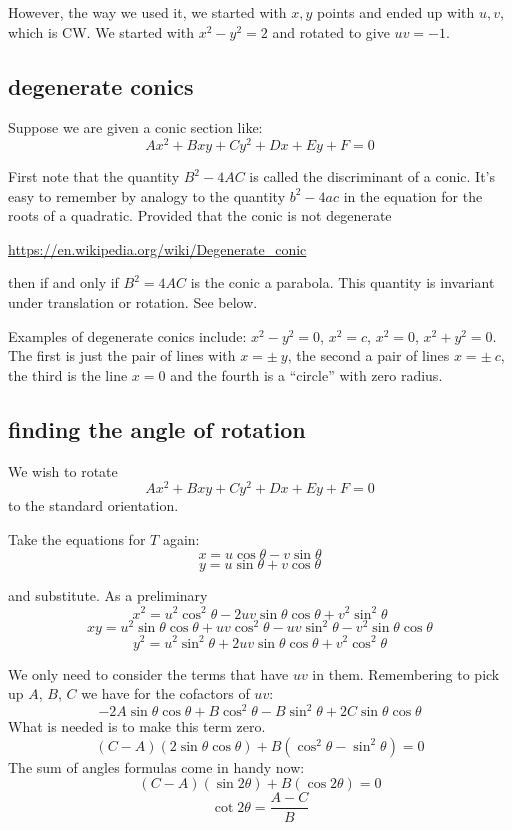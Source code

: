 \documentclass[11pt, oneside]{article}
\begin{document}
However, the way we used it, we started with $x,y$ points and ended up with $u,v$, which is CW.   We started with $x^2 - y^2 = 2$ and rotated to give $uv = - 1$.

\subsection*{degenerate conics}

Suppose we are given a conic section like:
\[ Ax^2 + Bxy + Cy^2 + Dx + Ey + F = 0 \] 

First note that the quantity $B^2 - 4AC$ is called the discriminant of a conic.  It's easy to remember by analogy to the quantity $b^2 - 4ac$ in the equation for the roots of a quadratic.  Provided that the conic is not degenerate

\url{https://en.wikipedia.org/wiki/Degenerate_conic}

then if and only if $B^2 = 4AC$ is the conic a parabola.  This quantity is invariant under translation or rotation.  See below.

Examples of degenerate conics include:  $x^2 - y^2 = 0$, $x^2 = c$, $x^2 = 0$, $x^2 + y^2 = 0$.  The first is just the pair of lines with $x= \pm \ y$, the second a pair of lines $x = \pm \ c$, the third is the line $x = 0$ and the fourth is a ``circle'' with zero radius.

\subsection*{finding the angle of rotation}

We wish to rotate
\[ Ax^2 + Bxy + Cy^2 + Dx + Ey + F = 0 \]
to the standard orientation.  

Take the equations for $T$ again:
\[ x = u \cos \theta - v \sin \theta \]
\[ y = u \sin \theta + v \cos \theta \]

and substitute.  As a preliminary
\[ x^2 = u^2 \cos^2 \theta - 2uv \sin \theta \cos \theta + v^2 \sin^2 \theta \]
\[ xy = u^2 \sin \theta \cos \theta + uv \cos^2 \theta - uv \sin^2 \theta - v^2 \sin \theta \cos \theta \]
\[ y^2 = u^2 \sin^2 \theta + 2uv \sin \theta \cos \theta + v^2 \cos^2 \theta \]

We only need to consider the terms that have $uv$ in them.  Remembering to pick up $A$, $B$, $C$ we have for the cofactors of $uv$:
\[ -2A \sin \theta \cos \theta + B \cos^2 \theta - B \sin^2 \theta + 2C \sin \theta \cos \theta \]
What is needed is to make this term zero.
\[ (C-A) (2 \sin \theta \cos \theta) + B (\cos^2 \theta - \sin^2 \theta) = 0 \]
The sum of angles formulas come in handy now:
\[ (C-A) (\sin 2 \theta) + B (\cos 2 \theta) = 0 \]
\[ \cot 2 \theta = \frac{A-C}{B} \]
\end{document}
